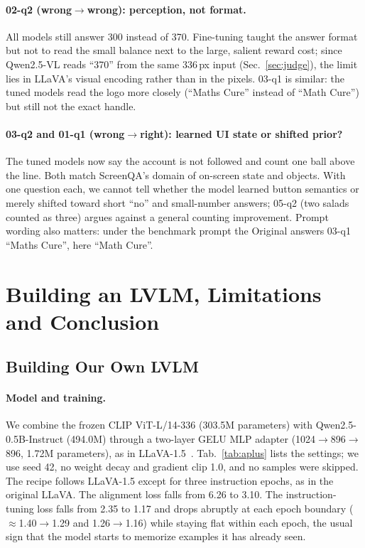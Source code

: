 \documentclass[10pt,twocolumn,letterpaper]{article}
\begin{document}
\paragraph{02-q2 (wrong$\to$wrong): perception, not format.} All models still answer 300 instead of 370. Fine-tuning taught the answer format but not to read the small balance next to the large, salient reward cost; since Qwen2.5-VL reads ``370'' from the same 336\,px input (Sec.~\ref{sec:judge}), the limit lies in LLaVA's visual encoding rather than in the pixels. 03-q1 is similar: the tuned models read the logo more closely (``Maths Cure'' instead of ``Math Cure'') but still not the exact handle.

\paragraph{03-q2 and 01-q1 (wrong$\to$right): learned UI state or shifted prior?} The tuned models now say the account is not followed and count one ball above the line. Both match ScreenQA's domain of on-screen state and objects. With one question each, we cannot tell whether the model learned button semantics or merely shifted toward short ``no'' and small-number answers; 05-q2 (two salads counted as three) argues against a general counting improvement. Prompt wording also matters: under the benchmark prompt the Original answers 03-q1 ``Maths Cure'', here ``Math Cure''.


\section{Building an LVLM, Limitations and Conclusion}
\label{sec:build}

\subsection{Building Our Own LVLM}

\paragraph{Model and training.} We combine the frozen CLIP ViT-L/14-336 (303.5M parameters) with Qwen2.5-0.5B-Instruct (494.0M) through a two-layer GELU MLP adapter (1024$\to$896$\to$896, 1.72M parameters), as in LLaVA-1.5~\cite{liu2023improvedllava}. Tab.~\ref{tab:aplus} lists the settings; we use seed 42, no weight decay and gradient clip 1.0, and no samples were skipped. The recipe follows LLaVA-1.5 except for three instruction epochs, as in the original LLaVA. The alignment loss falls from 6.26 to 3.10. The instruction-tuning loss falls from 2.35 to 1.17 and drops abruptly at each epoch boundary ($\approx$1.40$\to$1.29 and 1.26$\to$1.16) while staying flat within each epoch, the usual sign that the model starts to memorize examples it has already seen.
\end{document}
